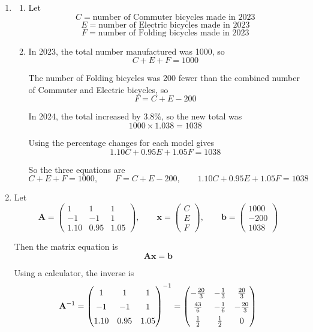 \documentclass[leqno]{article}
\begin{document}
\begin{enumerate}[
  label=\textbf{\arabic*.},
  leftmargin=*,
  topsep=0pt,
  partopsep=0pt,
  parsep=0pt
]
\begin{djsSolution}
\begin{enumerate}[label=\textbf{(\alph*)}]
  \item
  \begin{enumerate}[label=(\roman*)]
    \item Let
    \[
    C=\text{number of Commuter bicycles made in 2023}
    \]
    \[
    E=\text{number of Electric bicycles made in 2023}
    \]
    \[
    F=\text{number of Folding bicycles made in 2023}
    \]

    \item In 2023, the total number manufactured was 1000, so
    \[
    C+E+F=1000
    \]

    The number of Folding bicycles was 200 fewer than the combined number of Commuter and Electric bicycles, so
    \[
    F=C+E-200
    \]

    In 2024, the total increased by \(3.8\%\), so the new total was
    \[
    1000\times 1.038=1038
    \]

    Using the percentage changes for each model gives
    \[
    1.10C+0.95E+1.05F=1038
    \]

    So the three equations are
    \[
    C+E+F=1000,\qquad F=C+E-200,\qquad 1.10C+0.95E+1.05F=1038
    \]
  \end{enumerate}

  \item Let
  \[
  \mathbf{A}=\begin{pmatrix}
  1&1&1\\
  -1&-1&1\\
  1.10&0.95&1.05
  \end{pmatrix},
  \qquad
  \mathbf{x}=\begin{pmatrix}C\\E\\F\end{pmatrix},
  \qquad
  \mathbf{b}=\begin{pmatrix}1000\\-200\\1038\end{pmatrix}
  \]

  Then the matrix equation is
  \[
  \mathbf{A}\mathbf{x}=\mathbf{b}
  \]

Using a calculator, the inverse is
\[
\mathbf{A}^{-1}
=
\begin{pmatrix}
1&1&1\\
-1&-1&1\\
1.10&0.95&1.05
\end{pmatrix}^{-1}
=
\renewcommand{\arraystretch}{1.4}
\begin{pmatrix}
-\frac{20}{3}&-\frac{1}{3}&\frac{20}{3}\\
\frac{43}{6}&-\frac{1}{6}&-\frac{20}{3}\\
\frac12&\frac12&0
\end{pmatrix}
\]


\end{enumerate}
\end{djsSolution}
\end{enumerate}
\end{document}
